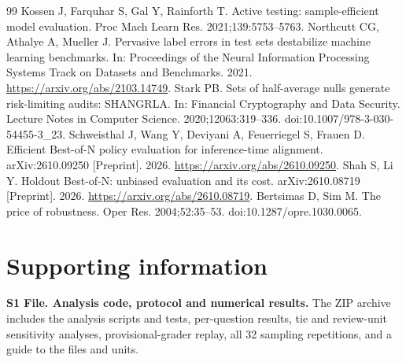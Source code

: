 \documentclass[10pt,letterpaper]{article}
\begin{document}
\begin{thebibliography}{99}
 Kossen J, Farquhar S, Gal Y, Rainforth T. Active testing: sample-efficient model evaluation. Proc Mach Learn Res. 2021;139:5753--5763.
 Northcutt CG, Athalye A, Mueller J. Pervasive label errors in test sets destabilize machine learning benchmarks. In: Proceedings of the Neural Information Processing Systems Track on Datasets and Benchmarks. 2021. \url{https://arxiv.org/abs/2103.14749}.
 Stark PB. Sets of half-average nulls generate risk-limiting audits: SHANGRLA. In: Financial Cryptography and Data Security. Lecture Notes in Computer Science. 2020;12063:319--336. doi:10.1007/978-3-030-54455-3\_23.
 Schweisthal J, Wang Y, Deviyani A, Feuerriegel S, Frauen D. Efficient Best-of-N policy evaluation for inference-time alignment. arXiv:2610.09250 [Preprint]. 2026. \url{https://arxiv.org/abs/2610.09250}.
 Shah S, Li Y. Holdout Best-of-N: unbiased evaluation and its cost. arXiv:2610.08719 [Preprint]. 2026. \url{https://arxiv.org/abs/2610.08719}.
 Bertsimas D, Sim M. The price of robustness. Oper Res. 2004;52:35--53. doi:10.1287/opre.1030.0065.

\end{thebibliography}
\section*{Supporting information}
\noindent\textbf{S1 File. Analysis code, protocol and numerical results.} The ZIP archive includes the analysis scripts and tests, per-question results, tie and review-unit sensitivity analyses, provisional-grader replay, all 32 sampling repetitions, and a guide to the files and units.
\end{document}
